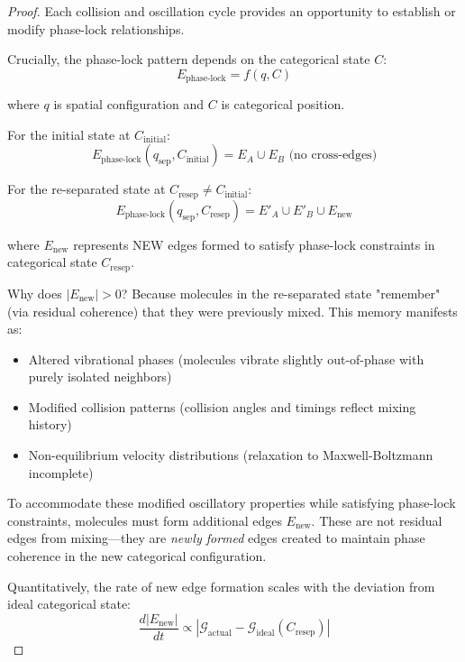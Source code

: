 \documentclass[12pt,a4paper]{article}
\theoremstyle{remark}
\begin{document}
\begin{proof}
Each collision and oscillation cycle provides an opportunity to establish or modify phase-lock relationships.

Crucially, the phase-lock pattern depends on the categorical state $C$:
\begin{equation}
E_{\text{phase-lock}} = f(q, C)
\end{equation}

where $q$ is spatial configuration and $C$ is categorical position.

For the initial state at $C_{\text{initial}}$:
\begin{equation}
E_{\text{phase-lock}}(q_{\text{sep}}, C_{\text{initial}}) = E_A \cup E_B \text{ (no cross-edges)}
\end{equation}

For the re-separated state at $C_{\text{resep}} \neq C_{\text{initial}}$:
\begin{equation}
E_{\text{phase-lock}}(q_{\text{sep}}, C_{\text{resep}}) = E'_A \cup E'_B \cup E_{\text{new}}
\end{equation}

where $E_{\text{new}}$ represents NEW edges formed to satisfy phase-lock constraints in categorical state $C_{\text{resep}}$.

Why does $|E_{\text{new}}| > 0$? Because molecules in the re-separated state "remember" (via residual coherence) that they were previously mixed. This memory manifests as:
\begin{itemize}
\item Altered vibrational phases (molecules vibrate slightly out-of-phase with purely isolated neighbors)
\item Modified collision patterns (collision angles and timings reflect mixing history)
\item Non-equilibrium velocity distributions (relaxation to Maxwell-Boltzmann incomplete)
\end{itemize}

To accommodate these modified oscillatory properties while satisfying phase-lock constraints, molecules must form additional edges $E_{\text{new}}$. These are not residual edges from mixing—they are \textit{newly formed} edges created to maintain phase coherence in the new categorical configuration.

Quantitatively, the rate of new edge formation scales with the deviation from ideal categorical state:
\begin{equation}
\frac{d|E_{\text{new}}|}{dt} \propto |\mathcal{G}_{\text{actual}} - \mathcal{G}_{\text{ideal}}(C_{\text{resep}})|
\end{equation}


\end{proof}
\end{document}
